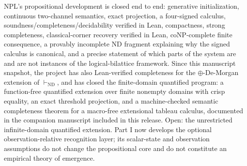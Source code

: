 \documentclass[11pt,a4paper]{article}
\theoremstyle{definition}
\newcommand{\hmz}{\oplus}                       %
\newcommand{\ndder}{\vdash_{\mathrm{ND}}}
\begin{document}
NPL's propositional development is closed end to end: generative
initialization, continuous two-channel semantics, exact projection, a
four-signed calculus, soundness/completeness/decidability verified in
Lean, compactness, strong completeness, classical-corner recovery verified in Lean, coNP-complete finite consequence, a provably
incomplete ND fragment explaining why the signed calculus is canonical,
and a precise statement of which parts of the system are and are not
instances of the logical-bilattice framework. Since this manuscript snapshot,
the project has also Lean-verified completeness for the $\hmz$-De-Morgan
extension of $\ndder$, and has closed the finite-domain quantified program:
a function-free quantified extension over finite nonempty domains with crisp
equality, an exact threshold projection, and a machine-checked semantic
completeness theorem for a macro-free extensional tableau calculus, documented
in the companion manuscript included in this release. Open:
the unrestricted infinite-domain quantified extension. Part I now develops
the optional observation-relative recognition layer; its scalar-state and
observation assumptions do not change the propositional core and do not
constitute an empirical theory of emergence.

\appendix
\end{document}
